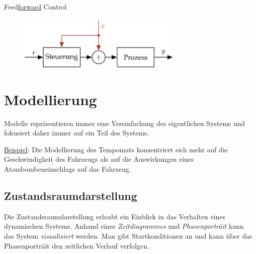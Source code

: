 \documentclass[
  10pt,
  a4paper,
]{article}
\numberwithin{equation}{section}
\begin{document}
\begin{multicols}{2}
Feed\ul{forward} Control

\begin{figure}[H]

{\centering \includegraphics[width=8cm,height=\textheight]{images/basics/control.png}

}

\end{figure}

\hypertarget{modellierung}{%
\section{Modellierung}\label{modellierung}}

\begin{tcolorbox}[enhanced jigsaw, coltitle=black, arc=.35mm, breakable, opacityback=0, opacitybacktitle=0.6, rightrule=.15mm, titlerule=0mm, bottomrule=.15mm, leftrule=.75mm, bottomtitle=1mm, colframe=quarto-callout-important-color-frame, toprule=.15mm, colbacktitle=quarto-callout-important-color!10!white, toptitle=1mm, title=\textcolor{quarto-callout-important-color}{\faExclamation}\hspace{0.5em}{Vereinfachung}, left=2mm, colback=white]

Modelle repräsentieren immer eine Vereinfachung des eigentlichen Systems
und fokusiert daher immer auf ein Teil des Systems.

\vspace{2mm}

\ul{Beispiel}: Die Modellierung des Tempomats konzentriert sich mehr auf
die Geschwindigkeit des Fahrzeugs als auf die Auswirkungen eines
Atombombeneinschlags auf das Fahrzeug.

\end{tcolorbox}

\hypertarget{zustandsraumdarstellung}{%
\subsection{Zustandsraumdarstellung}\label{zustandsraumdarstellung}}

Die Zustandsraumdarstellung erlaubt ein Einblick in das Verhalten eines
dynamischen Systems. Anhand eines \emph{Zeitdiagrammes} und
\emph{Phasenporträit} kann das System \emph{visualisiert} werden. Man
gibt Startkonditionen an und kann über das Phasenporträit den zeitlichen
Verlauf verfolgen.


\end{multicols}
\end{document}
